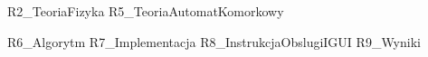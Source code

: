 \documentclass[pdflatex,11pt]{aghdpl}
\author{Dorota Wojtałow, Jacek Złydach}
\date{2010}
\begin{document}
\titlepages

\tableofcontents
\clearpage


 {R2_TeoriaFizyka}
 {R5_TeoriaAutomatKomorkowy}

 {R6_Algorytm}
 {R7_Implementacja}
 {R8_InstrukcjaObslugiIGUI}
 {R9_Wyniki}

% 
% 


\end{document}
